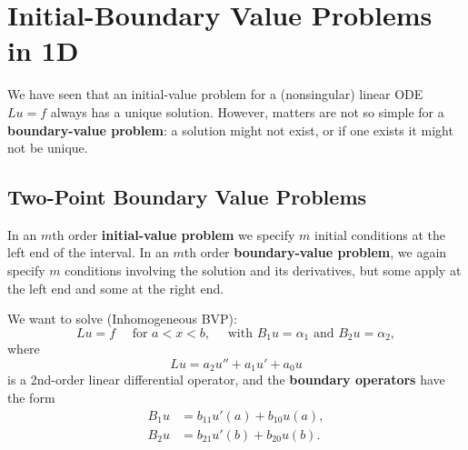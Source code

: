 \chapter{Initial-Boundary Value Problems in 1D}

We have seen that an initial-value problem for a (nonsingular) linear ODE \(Lu = f\) always has a unique solution. However, matters are not so simple for a \textbf{boundary-value problem}: a solution might not exist, or if one exists it might not be unique.

\section{Two-Point Boundary Value Problems}
In an \(m\)th order \textbf{initial-value problem} we specify \(m\) initial conditions at the left end of the interval. In an \(m\)th order \textbf{boundary-value problem}, we again specify \(m\) conditions involving the solution and its derivatives, but some apply at the left end and some at the right end.


\bigskip
We want to solve (Inhomogeneous BVP):
\[Lu = f \quad \text{ for } a < x < b, \quad \text{ with } B_1u = \alpha_1 \text{ and } B_2u = \alpha_2,\]
where
\[Lu = a_2u'' + a_1u' + a_0u\]
is a 2nd-order linear differential operator, and the \textbf{boundary operators} have the form
\begin{align*}
    B_1u & = b_{11}u'(a) + b_{10}u(a), \\
    B_2u & = b_{21}u'(b) + b_{20}u(b).
\end{align*}


